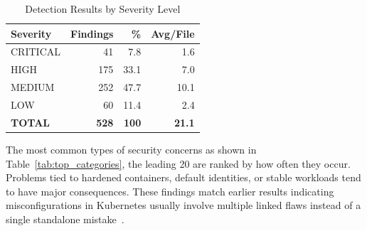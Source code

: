 \documentclass[preprint,12pt]{elsarticle}
\begin{document}
\begin{table}[]
\centering
\caption{Detection Results by Severity Level}
\label{tab:detection_severity}
\small
\setlength{\tabcolsep}{5pt}
\renewcommand{\arraystretch}{1.1}
\begin{tabular}{lrrr}
\hline
\textbf{Severity} & \textbf{Findings} & \textbf{\%} & \textbf{Avg/File} \\
\hline
CRITICAL & 41 & 7.8 & 1.6 \\
HIGH & 175 & 33.1 & 7.0 \\
MEDIUM & 252 & 47.7 & 10.1 \\
LOW & 60 & 11.4 & 2.4 \\
\hline
\textbf{TOTAL} & \textbf{528} & \textbf{100} & \textbf{21.1} \\
\hline
\end{tabular}
\end{table}



The most common types of security concerns as shown in Table~\ref{tab:top_categories}, the leading 20 are ranked by how often they occur. Problems tied to hardened containers, default identities, or stable workloads tend to have major consequences. These findings match earlier results indicating misconfigurations in Kubernetes usually involve multiple linked flaws instead of a single standalone mistake~\cite{rahman2023k8s}.
\end{document}
